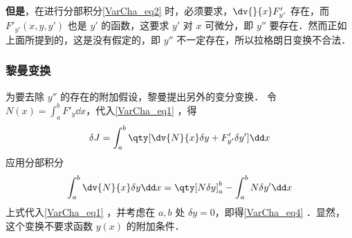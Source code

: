 \textbf{但是}，在进行分部积分\autoref{VarCha_eq2} 时，必须要求，$\dv{}{x}F'_{y'}$ 存在，而 $F'_{y'}(x,y,y')$ 也是 $y'$ 的函数，这要求 $y'$ 对 $x$ 可微分，即 $y''$ 要存在．然而正如上面所提到的，这是没有假定的，即 $y''$ 不一定存在，所以拉格朗日变换不合法．
\subsubsection{黎曼变换}
为要去除 $y''$ 的存在的附加假设，黎曼提出另外的变分变换．
令 $N(x)=\int_a^bF'_y\dd x$，代入\autoref{VarCha_eq1} ，得
\begin{equation}
\delta J=\int_a^b\qty[\dv{N}{x}\delta y+F'_{y'}\delta y']\dd x
\end{equation}
应用分部积分
\begin{equation}
\int_a^b\dv{N}{x}\delta y\dd x=\qty[N\delta y]_a^b-\int_a^bN\delta y'\dd x
\end{equation}
上式代入\autoref{VarCha_eq1} ，并考虑在 $a,b$ 处 $\delta y=0$，即得\autoref{VarCha_eq4} ．显然，这个变换不要求函数 $y(x)$ 的附加条件．
